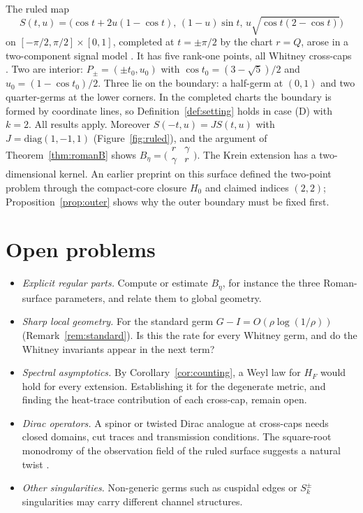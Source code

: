 \documentclass[11pt]{article}
\theoremstyle{definition}\newtheorem{definition}[theorem]{Definition}
\theoremstyle{remark}\newtheorem{remark}[theorem]{Remark}
\begin{document}
The ruled map
\[
 S(t,u)=\bigl(\cos t+2u(1-\cos t),\,(1-u)\sin t,\,u\sqrt{\cos t(2-\cos t)}\bigr)
\]
on $[-\pi/2,\pi/2]\times[0,1]$, completed at $t=\pm\pi/2$ by the chart $r=Q$,
arose in a two-component signal model \cite{paper1,ruled}. It has five rank-one
points, all Whitney cross-caps \cite{ruled}. Two are interior:
$P_\pm=(\pm t_0,u_0)$ with $\cos t_0=(3-\sqrt5)/2$ and $u_0=(1-\cos t_0)/2$.
Three lie on the boundary: a half-germ at $(0,1)$ and two quarter-germs at
the lower corners. In the completed charts the boundary is formed by
coordinate lines, so Definition~\ref{def:setting} holds in case (D) with
$k=2$. All results apply. Moreover $S(-t,u)=JS(t,u)$ with
$J=\mathrm{diag}(1,-1,1)$ (Figure~\ref{fig:ruled}), and the argument of
Theorem~\ref{thm:romanB} shows
$B_\eta=\bigl(\begin{smallmatrix}r&\gamma\\\gamma&r\end{smallmatrix}\bigr)$. The Krein
extension has a two-dimensional kernel. An earlier preprint on this surface
\cite{record} defined the two-point problem through the compact-core closure
$H_0$ and claimed indices $(2,2)$; Proposition~\ref{prop:outer} shows why the
outer boundary must be fixed first.

\section{Open problems}\label{sec:open}
\begin{itemize}
\item \emph{Explicit regular parts.} Compute or estimate $B_\eta$, for instance
the three Roman-surface parameters, and relate them to global geometry.
\item \emph{Sharp local geometry.} For the standard germ $G-I=O(\rho\log(1/\rho))$
(Remark~\ref{rem:standard}). Is this the rate for every Whitney germ, and do
the Whitney invariants appear in the next term?
\item \emph{Spectral asymptotics.} By Corollary~\ref{cor:counting}, a Weyl
law for $H_F$ would hold for every extension. Establishing it for the
degenerate metric, and finding the heat-trace contribution of each cross-cap,
remain open.
\item \emph{Dirac operators.} A spinor or twisted Dirac analogue at cross-caps
needs closed domains, cut traces and transmission conditions. The
square-root monodromy of the observation field of the ruled surface suggests
a natural twist \cite{paper1}.
\item \emph{Other singularities.} Non-generic germs such as cuspidal edges or
$S_k^\pm$ singularities may carry different channel structures.
\end{itemize}
\end{document}
